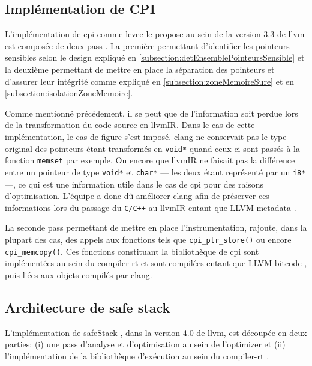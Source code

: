 \subsection{Implémentation de CPI}

L'implémentation de \gls{cpi} comme \gls{levee} le propose au sein de la version 3.3 de \gls{llvm} est composée de deux \og pass \fg. La première permettant d'identifier les pointeurs sensibles selon le design expliqué en \autoref{subsection:detEnsemblePointeursSensible} et la deuxième permettant de mettre en place la séparation des pointeurs et d'assurer leur intégrité comme expliqué en \autoref{subsection:zoneMemoireSure} et en \autoref{subsection:isolationZoneMemoire}.

Comme mentionné précédement, il se peut que de l'information soit perdue lors de la transformation du code source en \gls{llvmIR}. Dans le cas de cette implémentation, le cas de figure s'est imposé. \gls{clang} ne conservait pas le type original des pointeurs étant transformés en \texttt{void*} quand ceux-ci sont passés à la fonction \texttt{memset} par exemple. Ou encore que \gls{llvmIR} ne faisait pas la différence entre un pointeur de type \texttt{void*} et \texttt{char*} --- les deux étant représenté par un \texttt{i8*} ---, ce qui est une information utile dans le cas de \gls{cpi} pour des raisons d'optimisation. L'équipe a donc dû améliorer \gls{clang} afin de préserver ces informations lors du passage du \texttt{C/C++} au \gls{llvmIR} entant que \og LLVM metadata \fg.

La seconde \og pass \fg permettant de mettre en place l'instrumentation, rajoute, dans la plupart des cas, des appels aux fonctions tels que \texttt{cpi_ptr_store()} ou encore \texttt{cpi_memcopy()}. Ces fonctions constituant la bibliothèque de \gls{cpi} sont implémentées au sein du \og compiler-rt \fg et sont compilées entant que \og LLVM bitcode \fg, puis liées aux objets compilés par \gls{clang}.

\subsection{Architecture de \og safe stack \fg}
\label{subsection:architectureSafeStack}

L'implémentation de \og \gls{safeStack} \fg, dans la version 4.0 de \gls{llvm}, est découpée en deux parties: (i) une \og pass \fg d'analyse et d'optimisation au sein de l'\og optimizer \fg et (ii) l'implémentation de la bibliothèque d'exécution au sein du \og compiler-rt \fg.

